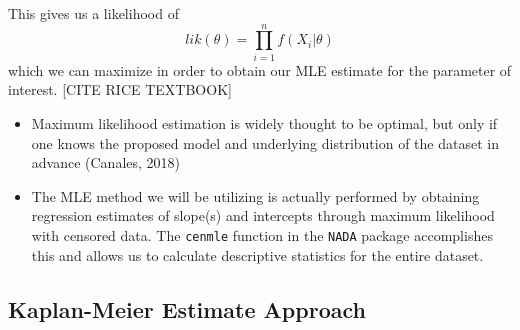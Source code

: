 \documentclass[12pt, twoside]{amherstthesis}
\begin{document}
This gives us a likelihood of \[lik(\theta) = \prod_{i=1}^n f(X_i|\theta)\] which we can maximize in order to obtain our MLE estimate for the parameter of interest. {[}CITE RICE TEXTBOOK{]}
\begin{itemize}
\item
  Maximum likelihood estimation is widely thought to be optimal, but only if one knows the proposed model and underlying distribution of the dataset in advance (Canales, 2018)
\item
  The MLE method we will be utilizing is actually performed by obtaining regression estimates of slope(s) and intercepts through maximum likelihood with censored data. The \texttt{cenmle} function in the \texttt{NADA} package accomplishes this and allows us to calculate descriptive statistics for the entire dataset.
\end{itemize}
\hypertarget{Kaplan-Meier}{%
\subsection{Kaplan-Meier Estimate Approach}\label{Kaplan-Meier}}
\end{document}

